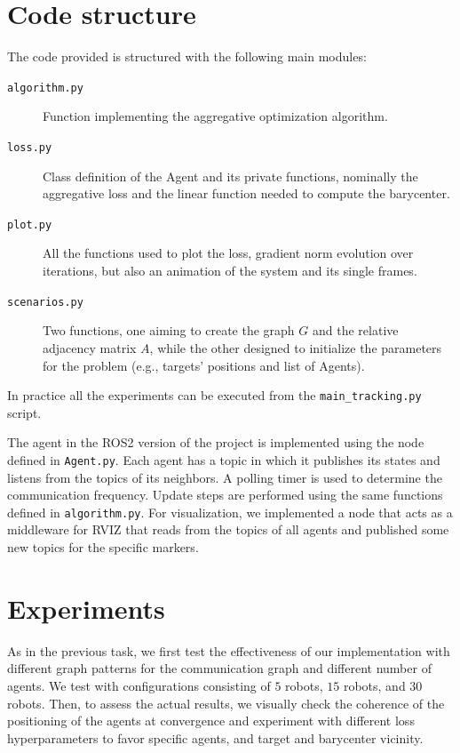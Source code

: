 \documentclass[a4paper,11pt,oneside]{book}
\begin{document}
\section{Code structure}
The code provided is structured with the following main modules:
\begin{description}
      \item[\texttt{algorithm.py}] Function implementing the aggregative optimization algorithm.
      \item[\texttt{loss.py}] Class definition of the Agent and its private functions, nominally the aggregative loss and the linear function needed to compute the barycenter.
      \item[\texttt{plot.py}] All the functions used to plot the loss, gradient norm evolution over iterations, but also an animation of the system and its single frames.
      \item[\texttt{scenarios.py}] Two functions, one aiming to create the graph $G$ and the relative adjacency matrix $A$, while the other designed to initialize the parameters for the problem (e.g., targets' positions and list of Agents).
\end{description}
In practice all the experiments can be executed from the \texttt{main\_tracking.py} script.

The agent in the ROS2 version of the project is implemented using the node defined in \texttt{Agent.py}. Each agent has a topic in which it publishes its states and listens from the topics of its neighbors. A polling timer is used to determine the communication frequency. Update steps are performed using the same functions defined in \texttt{algorithm.py}. For visualization, we implemented a node that acts as a middleware for RVIZ that reads from the topics of all agents and published some new topics for the specific markers.

\section{Experiments}

As in the previous task, we first test the effectiveness of our implementation with different graph patterns for the communication graph and different number of agents. We test with configurations consisting of $5$ robots, $15$ robots, and $30$ robots. Then, to assess the actual results, we visually check the coherence of the positioning of the agents at convergence and experiment with different loss hyperparameters to favor specific agents, and target and barycenter vicinity.
\end{document}
